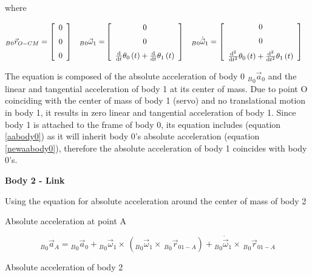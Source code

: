  where 
 
 \begin{align*}
_B{_0}\vec{r}_{O-CM} &= \left[ \begin {array}{c} 0\\ \noalign{\medskip}0\\ \noalign{\medskip}0
\end {array} \right] &
_B{_0}\vec{\omega}_{1} =&   \left[ \begin {array}{c} 0\\ \noalign{\medskip}0\\ \noalign{\medskip}
{\frac {\rm d}{{\rm d}t}}\theta_{{0}} \left( t \right) +{\frac {\rm d}
{{\rm d}t}}\theta_{{1}} \left( t \right) \end {array} \right] 
&
_B{_0}\dot{\vec{\omega}}_{1} &=  \left[ \begin {array}{c} 0\\ \noalign{\medskip}0\\ \noalign{\medskip}
{\frac {{\rm d}^{2}}{{\rm d}{t}^{2}}}\theta_{{0}} \left( t \right) +{
\frac {{\rm d}^{2}}{{\rm d}{t}^{2}}}\theta_{{1}} \left( t \right) 
\end {array} \right] 
 &
\end{align*}
 
 The equation is composed of the absolute acceleration of body 0 ${_B}_{0}\vec{a}_{0}$ and the linear and tangential acceleration of body 1 at its center of mass. Due to point O coinciding with the center of mass of body 1 (servo) and no translational motion in body 1, it results in zero linear and tangential acceleration of body 1. Since  body 1 is attached to the frame of body 0, its equation includes (equation \ref{aabody0}) as it will inherit body 0's absolute acceleration (equation \ref{newaabody0}), therefore the absolute acceleration of body 1 coincides with body 0's. 
 
 
\textbf{Body 2 - Link}
 
 Using the equation for absolute acceleration around the center of mass of body 2
 
  Absolute acceleration at point A
 
\begin{equation}\label{aabody2b}
{_B}_{0}\vec{a}_{A} = {_B}_{0}\vec{a}_{0}+{_B}_{0}\vec{\omega}_{1}\times \,({_B}_{0}\vec{\omega}_{1}\times \,{_B}_{0}\vec{r}_{01-A}) + {_B}_{0}\dot{\vec{\omega}}_{1}\times \,{_B}_{0}\vec{r}_{01-A}
\end{equation}
 
 
 Absolute acceleration of body 2

